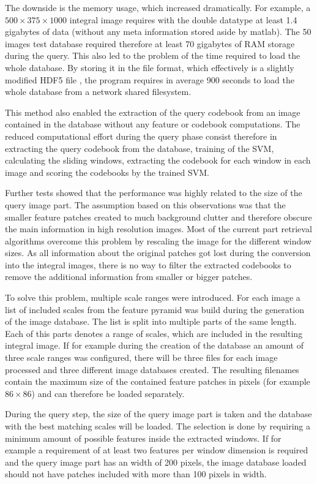 The downside is the memory usage, which increased dramatically. For example, a $500 \times 375 \times 1000$ integral image requires with the double datatype at least 1.4 gigabytes of data (without any meta information stored aside by matlab). The 50 images test database required therefore at least 70 gigabytes of RAM storage during the query. This also led to the problem of the time required to load the whole database. By storing it in the  file format, which effectively is a slightly modified HDF5 file \cite{hdf5}, the program requires in average 900 seconds to load the whole database from a network shared filesystem.

This method also enabled the extraction of the query codebook from an image contained in the database without any feature or codebook computations. The reduced computational effort during the query phase consist therefore in extracting the query codebook from the database, training of the \ac{SVM}, calculating the sliding windows, extracting the codebook for each window in each image and scoring the codebooks by the trained \ac{SVM}.

Further tests showed that the performance was highly related to the size of the query image part. The assumption based on this observations was that the smaller feature patches created to much background clutter and therefore obscure the main information in high resolution images. Most of the current part retrieval algorithms overcome this problem by rescaling the image for the different window sizes. As all information about the original patches got lost during the conversion into the integral images, there is no way to filter the extracted codebooks to remove the additional information from smaller or bigger patches.

To solve this problem, multiple scale ranges were introduced. For each image a list of included scales from the feature pyramid was build during the generation of the image database. The list is split into multiple parts of the same length. Each of this parts denotes a range of scales, which are included in the resulting integral image. If for example during the creation of the database an amount of three scale ranges was configured, there will be three files for each image processed and three different image databases created. The resulting filenames contain the maximum size of the contained feature patches in pixels (for example $86 \times 86$) and can therefore be loaded separately.

During the query step, the size of the query image part is taken and the database with the best matching scales will be loaded. The selection is done by requiring a minimum amount of possible features inside the extracted windows. If for example a requirement of at least two features per window dimension is required and the query image part has an width of 200 pixels, the image database loaded should not have patches included with more than 100 pixels in width.

